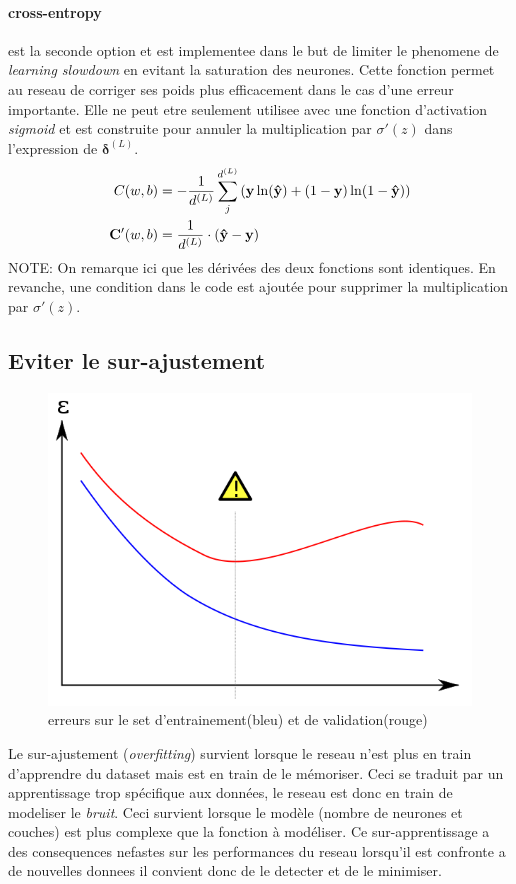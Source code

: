 \documentclass[11pt]{article}
\begin{document}
\paragraph{cross-entropy} est la seconde option et est implementee dans le but
de limiter le phenomene de \emph{learning slowdown} en evitant la saturation des
neurones. Cette fonction permet au reseau de corriger ses poids plus efficacement
dans le cas d'une erreur importante. Elle ne peut etre seulement utilisee
avec une fonction d'activation \emph{sigmoid} et est construite pour annuler la
multiplication par $\sigma'(z)$ dans l'expression de $\boldsymbol\delta^{(L)}$.
\begin{equation}
	\begin{aligned}
		C(w, b) &= -\frac{1}{d^{(L)}}\sum_{j}^{d^{(L)}}{\left({\bf y}\ln({\bf\hat y}) +
		(1-{\bf y})\ln(1- {\bf \hat y})\right)}  \\
		{\bf C'}(w, b) &= \frac{1}{d^{(L)}}\cdot({\bf\hat y} - {\bf y})
	\end{aligned}
\end{equation}
NOTE: On remarque ici que les d\'eriv\'ees des deux fonctions sont identiques. En
revanche, une condition dans le code est ajout\'ee pour supprimer la multiplication
par $\sigma'(z)$.


\subsection{Eviter le sur-ajustement}\label{overfitting}
\begin{figure}[htp]
	\centering
	\includegraphics[scale=.4]{img/overfitting.png}
	\caption{erreurs sur le set d'entrainement(bleu) et de validation(rouge)}
\end{figure}
Le sur-ajustement (\emph{overfitting}) survient lorsque le reseau n'est plus
en train d'apprendre du dataset mais est en train de le m\'emoriser. Ceci se
traduit par un apprentissage trop sp\'ecifique aux donn\'ees, le reseau est
donc en train de modeliser le \emph{bruit}. Ceci survient lorsque le mod\`ele
(nombre de neurones et couches) est plus complexe que la fonction \`a
mod\'eliser. Ce sur-apprentissage a des consequences nefastes sur les
performances du reseau lorsqu'il est confronte a de nouvelles donnees il convient
donc de le detecter et de le minimiser.
\end{document}
